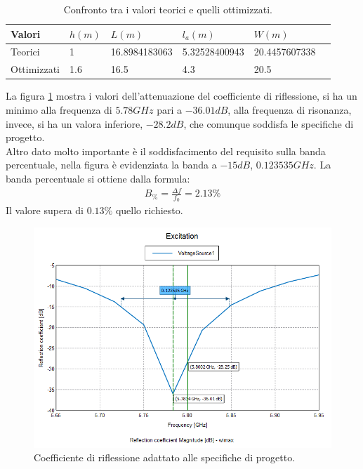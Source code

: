\begin{table}[h]\footnotesize
\caption{Confronto tra i valori teorici e quelli ottimizzati.}
\label{tab:confronto}
\begin{tabularx}{\textwidth}{XXXXXX}
\toprule
Valori & $h(m)$ & $L(m)$ & $l_a(m)$ & $W(m)$ \\
\midrule
Teorici & 1 & 16.8984183063 & 5.32528400943 & 20.4457607338 \\
Ottimizzati & 1.6 & 16.5 & 4.3 & 20.5 \\
\bottomrule
\end{tabularx}
\end{table}
  
La figura \ref{img:reflopt} mostra i valori dell'attenuazione del coefficiente di riflessione, si ha un minimo alla frequenza di $5.78 GHz$ pari a $-36.01 dB$, alla frequenza di risonanza, invece, si ha un valora inferiore, $-28.2  dB$, che comunque soddisfa le specifiche di progetto. \\
Altro dato molto importante è il soddisfacimento del requisito sulla banda percentuale, nella figura è evidenziata la banda a $-15 dB$, $0.123535 GHz$. La banda percentuale si ottiene dalla formula:
\begin{align}
B_{\%} = \frac{\Delta f}{f_0} = 2.13\%
\end{align}
Il valore supera di $0.13\%$ quello richiesto. \\[1cm]

\begin{figure}
\centering
\caption{Coefficiente di riflessione adattato alle specifiche di progetto.}
\label{img:reflopt}
\includegraphics[scale=0.5]{Immagini/reflection_coefficient_optimized}
\end{figure}

